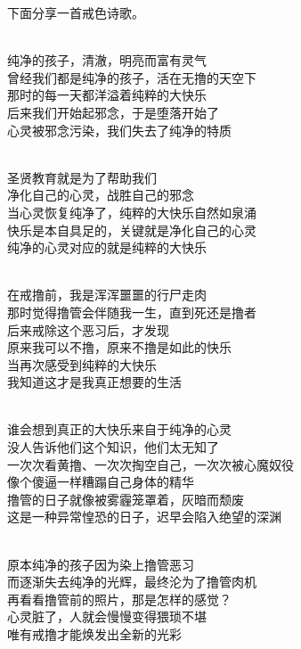 下面分享一首戒色诗歌。

\begin{poem}[纯净纯善赤子之心]
    \begin{multicols}{2}
        \begin{center}~\\
            纯净的孩子，清澈，明亮而富有灵气 \\ 曾经我们都是纯净的孩子，活在无撸的天空下 \\ 那时的每一天都洋溢着纯粹的大快乐 \\ 后来我们开始起邪念，于是堕落开始了 \\ 心灵被邪念污染，我们失去了纯净的特质

            ~\\

            圣贤教育就是为了帮助我们 \\ 净化自己的心灵，战胜自己的邪念 \\ 当心灵恢复纯净了，纯粹的大快乐自然如泉涌 \\ 快乐是本自具足的，关键就是净化自己的心灵 \\ 纯净的心灵对应的就是纯粹的大快乐

            ~\\

            在戒撸前，我是浑浑噩噩的行尸走肉 \\ 那时觉得撸管会伴随我一生，直到死还是撸者 \\ 后来戒除这个恶习后，才发现 \\ 原来我可以不撸，原来不撸是如此的快乐 \\ 当再次感受到纯粹的大快乐 \\ 我知道这才是我真正想要的生活

            ~\\

            谁会想到真正的大快乐来自于纯净的心灵 \\ 没人告诉他们这个知识，他们太无知了 \\ 一次次看黄撸、一次次掏空自己，一次次被心魔奴役 \\ 像个傻逼一样糟蹋自己身体的精华 \\ 撸管的日子就像被雾霾笼罩着，灰暗而颓废 \\ 这是一种异常惶恐的日子，迟早会陷入绝望的深渊

            ~\\

            原本纯净的孩子因为染上撸管恶习 \\ 而逐渐失去纯净的光辉，最终沦为了撸管肉机 \\ 再看看撸管前的照片，那是怎样的感觉？ \\ 心灵脏了，人就会慢慢变得猥琐不堪 \\ 唯有戒撸才能焕发出全新的光彩


\end{center}
\end{multicols}
\end{poem}
